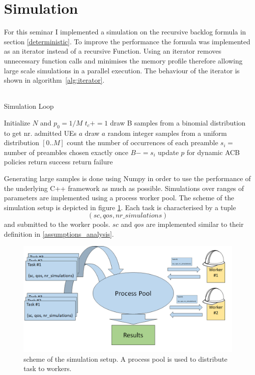 \documentclass[conference]{IEEEtran}
\begin{document}
\section{Simulation}
For this seminar I implemented a simulation on the recursive backlog formula in section \ref{deterministic}.
To improve the performance the formula was implemented as an iterator instead of a recursive Function.
Using an iterator removes unnecessary function calls and minimises the memory profile therefore allowing large scale simulations in a parallel execution.
The behaviour of the iterator is shown in algorithm~\ref{alg:iterator}.\\\\
\begin{algorithm}
    \caption{Simulation Loop}\label{alg:iterator}
\begin{algorithmic}[1]
    \State Initialize $N$ and $p_0=1/M$
    \State $t_c+=1$
    \State draw B samples from a binomial distribution to get nr. admitted UEs $a$
    \State draw $a$ random integer samples from a uniform distribution $[0.. M]$
    \State count the number of occurrences of each preamble
    \State $s_i= $ number of preambles chosen exactly once
    \State $B -= s_i$
    \State update $p$ for dynamic ACB policies
    \EndWhile
    \State return success
    \Else
    \State return failure
    \EndIf
\end{algorithmic}
\end{algorithm}
Generating large samples is done using Numpy in order to use the performance of the underlying C++ framework as much as possible.
Simulations over ranges of parameters are implemented using a process worker pool. The scheme of the simulation setup is depicted in figure \ref{fig:pool}.
Each task is characterised by a tuple \[(sc, qos, nr\_simulations)\] and submitted to the worker pools.
$sc$ and $qos$ are implemented similar to their definition in \ref{assumptions_analysis}.
\begin{figure}
    \centering
    \includegraphics[width = \columnwidth]{../Figures/process_pool_worker.png}
    \caption{scheme of the simulation setup. A process pool is used to distribute task to workers.}
    \label{fig:pool}
\end{figure}
\end{document}
